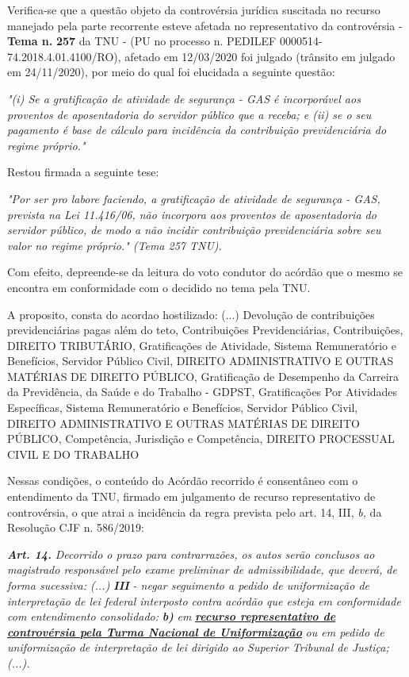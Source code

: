 \documentclass[12pt]{article}
\begin{document}
\justifying
\noindent Verifica-se que a questão objeto da controvérsia jurídica suscitada no recurso manejado pela parte recorrente esteve afetada no representativo da controvérsia - \textbf{Tema n. }\textbf{257} da TNU - (PU no processo n. PEDILEF 0000514-74.2018.4.01.4100/RO),  afetado em 12/03/2020 foi julgado (trânsito em julgado em 24/11/2020), por meio do qual foi elucidada a seguinte questão:

\noindent \textit{"(i) Se a gratificação de atividade de segurança - GAS é incorporável aos proventos de aposentadoria do servidor público que a receba;  e (ii) se o seu pagamento é base de cálculo para incidência da contribuição previdenciária do regime próprio."}

\noindent Restou firmada a seguinte tese:

\noindent \textit{"Por ser pro labore faciendo, a gratificação de atividade de segurança - GAS, prevista na Lei 11.416/06, não incorpora aos proventos de aposentadoria do servidor público, de modo a não incidir contribuição previdenciária sobre seu valor no regime próprio." (Tema 257 TNU).}

\noindent Com efeito, depreende-se da leitura do voto condutor do acórdão que o mesmo se encontra em conformidade com o decidido no  tema pela TNU.

\noindent A proposito, consta do acordao hostilizado: (...) Devolução de contribuições previdenciárias pagas além do teto, Contribuições Previdenciárias, Contribuições, DIREITO TRIBUTÁRIO, Gratificações de Atividade, Sistema Remuneratório e Benefícios, Servidor Público Civil, DIREITO ADMINISTRATIVO E OUTRAS MATÉRIAS DE DIREITO PÚBLICO, Gratificação de Desempenho da Carreira da Previdência, da Saúde e do Trabalho - GDPST, Gratificações Por Atividades Específicas, Sistema Remuneratório e Benefícios, Servidor Público Civil, DIREITO ADMINISTRATIVO E OUTRAS MATÉRIAS DE DIREITO PÚBLICO, Competência, Jurisdição e Competência, DIREITO PROCESSUAL CIVIL E DO TRABALHO

\noindent Nessas condições, o conteúdo do Acórdão recorrido é consentâneo com o entendimento da TNU, firmado em julgamento de recurso representativo de controvérsia, o que atrai a incidência da regra prevista pelo art. 14, III, \textit{b,} da Resolução CJF n. 586/2019:

\noindent \textit{\textbf{Art. 14.}}\textit{ Decorrido o prazo para contrarrazões, os autos serão conclusos ao magistrado responsável pelo exame preliminar de admissibilidade, que deverá, de forma sucessiva: (...) }\textit{\textbf{III }}\textit{- negar seguimento a pedido de uniformização de interpretação de lei federal interposto contra acórdão que esteja em conformidade com entendimento consolidado: }\textit{\textbf{b)}}\textit{ em }\uline{\textit{\textbf{recurso representativo de controvérsia pela Turma Nacional de Uniformização}}}\textit{ ou em pedido de uniformização de interpretação de lei dirigido ao Superior Tribunal de Justiça;(...).}
\end{document}
